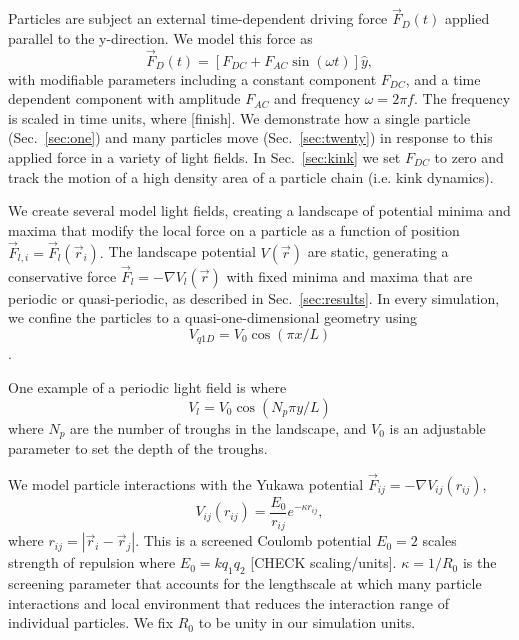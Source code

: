 \documentclass[prb,preprint]{revtex4}
\begin{document}
Particles are subject an external time-dependent driving force
$\vec{F}_{D}(t)$
applied parallel to the y-direction.
We model this force as
\begin{equation}
\vec{F}_{D}(t) = [F_{DC} + F_{AC} \sin(\omega t)] \hat{y},
\end{equation}
with modifiable parameters including
a constant component $F_{DC}$,
and a time dependent component with amplitude $F_{AC}$
and frequency $\omega = 2 \pi f$.
The frequency is scaled in time units,
where [finish].
 We demonstrate how a single particle (Sec.~\ref{sec:one})
 and many particles
 move (Sec.~\ref{sec:twenty})
 in response to this applied force in a variety of light fields.
 In Sec.~\ref{sec:kink} we set $F_{DC}$
 to zero and track the motion
 of a high density area of a particle chain
 (i.e. kink dynamics).

 We create several model light fields,
 creating a landscape of potential minima and maxima
 that modify the local force on a particle as a function of position
 $\vec{F}_{l,i} = \vec{F}_{l}(\vec{r}_i).$
 The landscape potential $V(\vec{r}) $ are static,
 generating a conservative force $\vec{F}_l= -\nabla V_l(\vec{r})$
 with fixed minima and maxima
 that are periodic or quasi-periodic,
 as described in Sec.~\ref{sec:results}.
 In every simulation, we confine
 the particles to a quasi-one-dimensional geometry
 using 
 \begin{equation}
   V_{q1D} = V_0 \cos{(\pi x / L)}
 \end{equation}.
 
 One example of a periodic light field is
 where 
 \begin{equation}
   V_l = V_0 \cos{(N_p \pi y / L)}
 \end{equation}
 where $N_p$ are the number of troughs in the landscape,
 and $V_0$ is an adjustable parameter
 to set the depth of the troughs.
 
 We model particle interactions with
 the Yukawa potential $\vec{F}_{ij} = -\nabla V_{ij}(r_{ij})$,
 \begin{equation}
   V_{ij}(r_{ij}) = \frac{E_0}{r_{ij}} e^{-\kappa r_{ij}},
 \end{equation}
 where $r_{ij} = |\vec{r}_i - \vec{r}_j|$.
 This is a
 screened Coulomb potential
 $E_0=2$ scales strength of repulsion
 where $E_0 = k q_1 q_2$  [CHECK scaling/units].
 $\kappa = 1/R_0$ is the screening parameter 
that accounts for the lengthscale at
which many particle
interactions and local environment
that reduces the interaction range of individual particles.
We fix $R_0$ to be unity in our simulation units.
\end{document}
